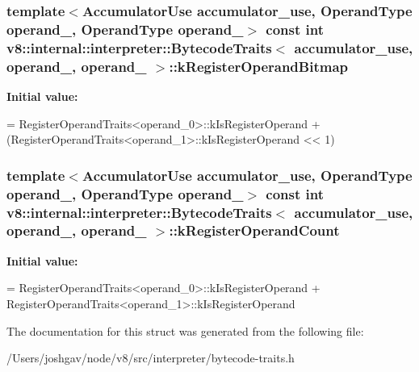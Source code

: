 \subsubsection[{\texorpdfstring{k\+Register\+Operand\+Bitmap}{kRegisterOperandBitmap}}]{\setlength{\rightskip}{0pt plus 5cm}template$<$Accumulator\+Use accumulator\+\_\+use, Operand\+Type operand\+\_, Operand\+Type operand\+\_$>$ const int {\bf v8\+::internal\+::interpreter\+::\+Bytecode\+Traits}$<$ accumulator\+\_\+use, operand\+\_, operand\+\_ $>$\+::k\+Register\+Operand\+Bitmap\hspace{0.3cm}{\ttfamily [static]}}\hypertarget{structv8_1_1internal_1_1interpreter_1_1_bytecode_traits_3_01accumulator__use_00_01operand__0_00_01operand__1_01_4_a1fbc0e9cc32a4594e39cbeeb8cec0121}{}\label{structv8_1_1internal_1_1interpreter_1_1_bytecode_traits_3_01accumulator__use_00_01operand__0_00_01operand__1_01_4_a1fbc0e9cc32a4594e39cbeeb8cec0121}
{\bfseries Initial value\+:}
\begin{DoxyCode}
=
      RegisterOperandTraits<operand\_0>::kIsRegisterOperand +
      (RegisterOperandTraits<operand\_1>::kIsRegisterOperand << 1)
\end{DoxyCode}
\subsubsection[{\texorpdfstring{k\+Register\+Operand\+Count}{kRegisterOperandCount}}]{\setlength{\rightskip}{0pt plus 5cm}template$<$Accumulator\+Use accumulator\+\_\+use, Operand\+Type operand\+\_, Operand\+Type operand\+\_$>$ const int {\bf v8\+::internal\+::interpreter\+::\+Bytecode\+Traits}$<$ accumulator\+\_\+use, operand\+\_, operand\+\_ $>$\+::k\+Register\+Operand\+Count\hspace{0.3cm}{\ttfamily [static]}}\hypertarget{structv8_1_1internal_1_1interpreter_1_1_bytecode_traits_3_01accumulator__use_00_01operand__0_00_01operand__1_01_4_adcb8e4df6189943ab097cd5226e3d646}{}\label{structv8_1_1internal_1_1interpreter_1_1_bytecode_traits_3_01accumulator__use_00_01operand__0_00_01operand__1_01_4_adcb8e4df6189943ab097cd5226e3d646}
{\bfseries Initial value\+:}
\begin{DoxyCode}
=
      RegisterOperandTraits<operand\_0>::kIsRegisterOperand +
      RegisterOperandTraits<operand\_1>::kIsRegisterOperand
\end{DoxyCode}


The documentation for this struct was generated from the following file\+:\begin{DoxyCompactItemize}
\item 
/\+Users/joshgav/node/v8/src/interpreter/bytecode-\/traits.\+h\end{DoxyCompactItemize}
